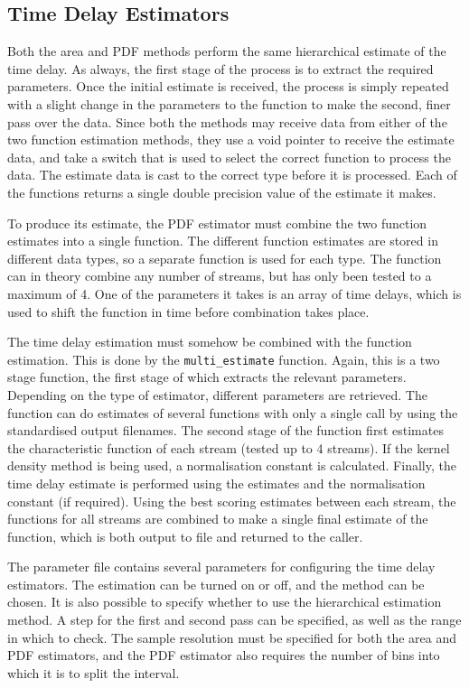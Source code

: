 \documentclass[a4paper,11pt]{article}
\begin{document}
\subsection{Time Delay Estimators}
\label{sec-6-8}

   Both the area and PDF methods perform the same hierarchical estimate of the
   time delay. As always, the first stage of the process is to extract the
   required parameters. Once the initial estimate is received, the process is
   simply repeated with a slight change in the parameters to the function to
   make the second, finer pass over the data. Since both the methods may receive
   data from either of the two function estimation methods, they use a void
   pointer to receive the estimate data, and take a switch that is used to
   select the correct function to process the data. The estimate data is cast to
   the correct type before it is processed. Each of the functions returns a
   single double precision value of the estimate it makes.

   To produce its estimate, the PDF estimator must combine the two function
   estimates into a single function. The different function estimates are stored
   in different data types, so a separate function is used for each type. The
   function can in theory combine any number of streams, but has only been
   tested to a maximum of 4. One of the parameters it takes is an array of time
   delays, which is used to shift the function in time before combination takes
   place.

   The time delay estimation must somehow be combined with the function
   estimation. This is done by the \texttt{multi\_estimate} function. Again,
   this is a two stage function, the first stage of which extracts the relevant
   parameters. Depending on the type of estimator, different parameters are
   retrieved. The function can do estimates of several functions with only a
   single call by using the standardised output filenames. The second stage of
   the function first estimates the characteristic function of each stream
   (tested up to 4 streams). If the kernel density method is being used, a
   normalisation constant is calculated. Finally, the time delay estimate is
   performed using the estimates and the normalisation constant (if
   required). Using the best scoring estimates between each stream, the
   functions for all streams are combined to make a single final estimate of the
   function, which is both output to file and returned to the caller.

   The parameter file contains several parameters for configuring the time delay
   estimators. The estimation can be turned on or off, and the method can be
   chosen. It is also possible to specify whether to use the hierarchical
   estimation method. A step for the first and second pass can be specified, as
   well as the range in which to check. The sample resolution must be specified
   for both the area and PDF estimators, and the PDF estimator also requires the
   number of bins into which it is to split the interval.
\end{document}
